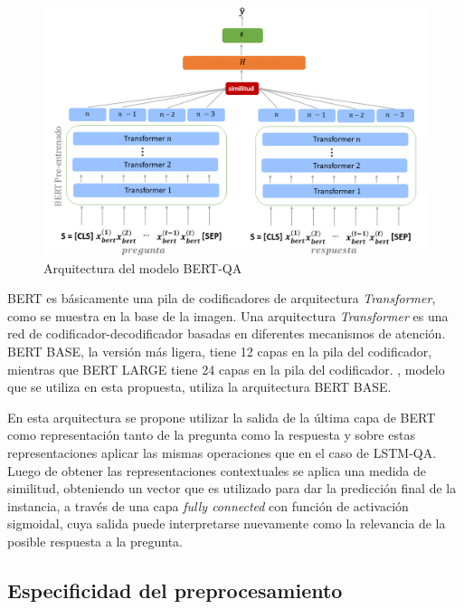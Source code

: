 \begin{figure}[!tb]
  \begin{center}
    \includegraphics[angle=0, width=1\textwidth]{Graphics/bert_qa.png}
  \end{center}
    \caption{Arquitectura del modelo BERT-QA}\label{bert_qa}
\end{figure}

BERT es básicamente una pila de codificadores de arquitectura \textit{Transformer}, como se muestra en la base de la imagen. Una arquitectura \textit{Transformer} es una red de codificador-decodificador basadas en diferentes mecanismos de atención. BERT BASE, la versión más ligera, tiene 12 capas en la pila del codificador, mientras que BERT LARGE tiene 24 capas en la pila del codificador. \cite{2020-spanish-bert}, modelo que se utiliza en esta propuesta, utiliza la arquitectura BERT BASE.

En esta arquitectura se propone utilizar la salida de la última capa de BERT como representación tanto de la pregunta como la respuesta y sobre estas representaciones aplicar las mismas operaciones que en el caso de LSTM-QA. Luego de obtener las representaciones contextuales se aplica una medida de similitud, obteniendo un vector que es utilizado para dar la predicción final de la instancia, a través de una capa \textit{fully connected} con función de activación sigmoidal, cuya salida puede interpretarse nuevamente como la relevancia de la posible respuesta a la pregunta.


\subsection{Especificidad del preprocesamiento}

